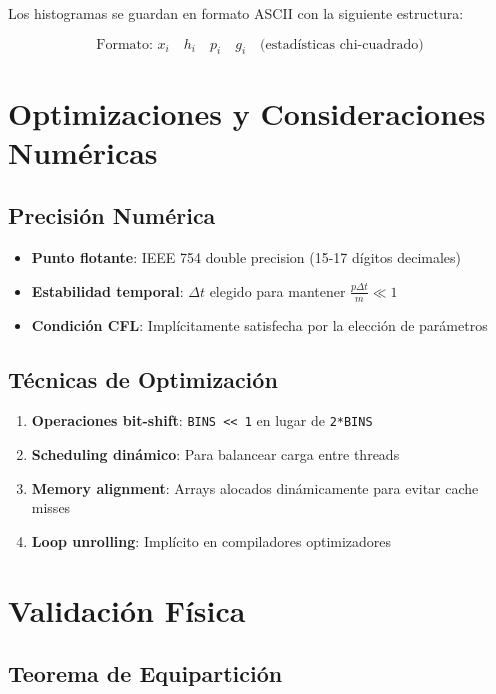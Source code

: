 \documentclass[12pt,a4paper]{article}
\begin{document}
Los histogramas se guardan en formato ASCII con la siguiente estructura:

\begin{equation}
\text{Formato: } x_i \quad h_i \quad p_i \quad g_i \quad \text{(estadísticas chi-cuadrado)}
\end{equation}

\section{Optimizaciones y Consideraciones Numéricas}

\subsection{Precisión Numérica}

\begin{itemize}
    \item \textbf{Punto flotante}: IEEE 754 double precision (15-17 dígitos decimales)
    \item \textbf{Estabilidad temporal}: $\Delta t$ elegido para mantener $\frac{p \Delta t}{m} \ll 1$
    \item \textbf{Condición CFL}: Implícitamente satisfecha por la elección de parámetros
\end{itemize}

\subsection{Técnicas de Optimización}

\begin{enumerate}
    \item \textbf{Operaciones bit-shift}: \texttt{BINS << 1} en lugar de \texttt{2*BINS}
    \item \textbf{Scheduling dinámico}: Para balancear carga entre threads
    \item \textbf{Memory alignment}: Arrays alocados dinámicamente para evitar cache misses
    \item \textbf{Loop unrolling}: Implícito en compiladores optimizadores
\end{enumerate}

\section{Validación Física}

\subsection{Teorema de Equipartición}
\end{document}
